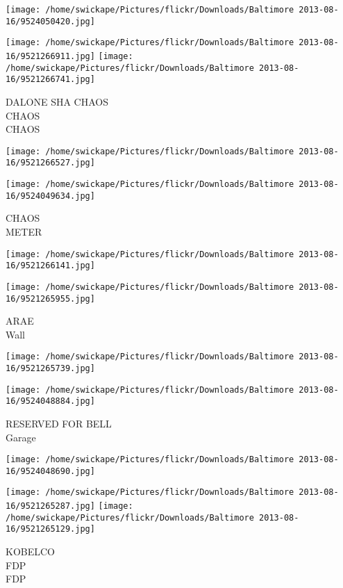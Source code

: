 \documentclass[10pt,letterpaper]{article}
\begin{document}
\texttt{[image: /home/swickape/Pictures/flickr/Downloads/Baltimore 2013-08-16/9524050420.jpg]}

\vspace{0.25in}
\texttt{[image: /home/swickape/Pictures/flickr/Downloads/Baltimore 2013-08-16/9521266911.jpg]}
\texttt{[image: /home/swickape/Pictures/flickr/Downloads/Baltimore 2013-08-16/9521266741.jpg]}

DALONE SHA CHAOS\\
CHAOS\\
CHAOS
\pagebreak

\texttt{[image: /home/swickape/Pictures/flickr/Downloads/Baltimore 2013-08-16/9521266527.jpg]}

\vspace{0.25in}
\texttt{[image: /home/swickape/Pictures/flickr/Downloads/Baltimore 2013-08-16/9524049634.jpg]}

CHAOS\\
METER
\pagebreak

\texttt{[image: /home/swickape/Pictures/flickr/Downloads/Baltimore 2013-08-16/9521266141.jpg]}

\vspace{0.25in}
\texttt{[image: /home/swickape/Pictures/flickr/Downloads/Baltimore 2013-08-16/9521265955.jpg]}

ARAE\\
Wall
\pagebreak

\texttt{[image: /home/swickape/Pictures/flickr/Downloads/Baltimore 2013-08-16/9521265739.jpg]}

\vspace{0.25in}
\texttt{[image: /home/swickape/Pictures/flickr/Downloads/Baltimore 2013-08-16/9524048884.jpg]}

RESERVED FOR BELL\\
Garage
\pagebreak

\texttt{[image: /home/swickape/Pictures/flickr/Downloads/Baltimore 2013-08-16/9524048690.jpg]}

\vspace{0.25in}
\texttt{[image: /home/swickape/Pictures/flickr/Downloads/Baltimore 2013-08-16/9521265287.jpg]}
\texttt{[image: /home/swickape/Pictures/flickr/Downloads/Baltimore 2013-08-16/9521265129.jpg]}

KOBELCO\\
FDP\\
FDP
\pagebreak
\end{document}
